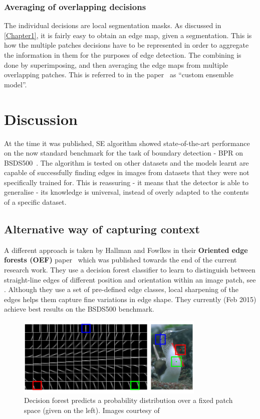 \subsubsection{Averaging of overlapping decisions}
The individual decisions are local segmentation masks. As discussed in \cref{Chapter1}, it is fairly easy to obtain an edge map, given a segmentation. This is how the multiple patches decisions have to be represented in order to aggregate the information in them for the purposes of edge detection. The combining is done by superimposing, %
and then averaging the edge maps from multiple overlapping patches. %
This is referred to in the paper~\cite{DollarICCV13edges} as ``custom ensemble model''.

\section{Discussion}
At the time it was published, SE algorithm showed state-of-the-art performance on the now standard benchmark for the task of boundary detection - BPR on BSDS500~\cite{Arbelaez11}. The algorithm is tested on other datasets and the models learnt are capable of successfully finding edges in images from datasets that they were not specifically trained for. This is reassuring - it means that the detector is able to generalise - its knowledge is universal, instead of overly adapted to %
the contents of a specific dataset.

\subsection{Alternative way of capturing context}
A different approach is taken by Hallman and Fowlkes in their \textbf{Oriented edge forests (OEF)} paper~\cite{Hallman2014} which was published towards the end of the current research work. They use a decision forest classifier to learn to distinguish between straight-line edges of different position and orientation within an image patch, see . Although they use a set of pre-defined edge classes, local sharpening of the edges helps them capture fine variations in edge shape. They currently (Feb 2015) achieve best results on the BSDS500 benchmark.

\begin{figure}[ht!]
\centering
\includegraphics[width=0.8\textwidth]{images/OEF-oriented-patch-space.png} %
\caption{Decision forest predicts a probability distribution over a fixed patch space (given on the left). Images courtesy of~\cite{Hallman2014}}
\label{fig:OEF-oriented-patch-space}
\end{figure}

